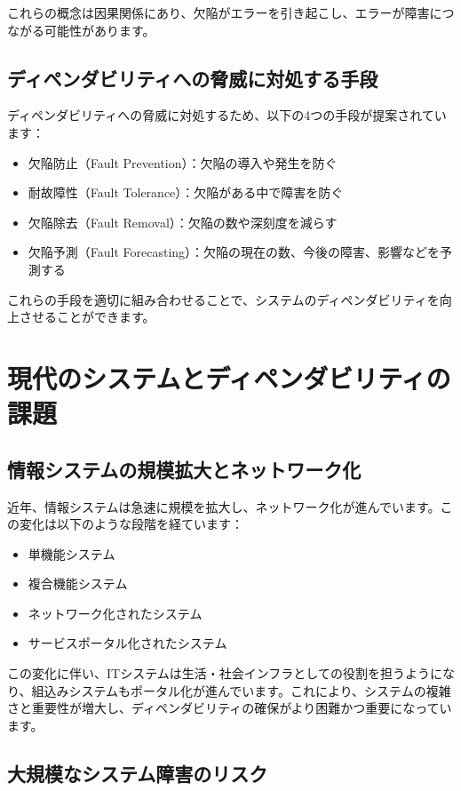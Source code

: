これらの概念は因果関係にあり、欠陥がエラーを引き起こし、エラーが障害につながる可能性があります。

\subsection{ディペンダビリティへの脅威に対処する手段}

ディペンダビリティへの脅威に対処するため、以下の4つの手段が提案されています：
\begin{itemize}
\item 欠陥防止（Fault Prevention）：欠陥の導入や発生を防ぐ
\item 耐故障性（Fault Tolerance）：欠陥がある中で障害を防ぐ
\item 欠陥除去（Fault Removal）：欠陥の数や深刻度を減らす
\item 欠陥予測（Fault Forecasting）：欠陥の現在の数、今後の障害、影響などを予測する
\end{itemize}
これらの手段を適切に組み合わせることで、システムのディペンダビリティを向上させることができます。

\section{現代のシステムとディペンダビリティの課題}

\subsection{情報システムの規模拡大とネットワーク化}

近年、情報システムは急速に規模を拡大し、ネットワーク化が進んでいます。この変化は以下のような段階を経ています：

\begin{itemize}
\item 単機能システム
\item 複合機能システム
\item ネットワーク化されたシステム
\item サービスポータル化されたシステム
\end{itemize}

この変化に伴い、ITシステムは生活・社会インフラとしての役割を担うようになり、組込みシステムもポータル化が進んでいます。これにより、システムの複雑さと重要性が増大し、ディペンダビリティの確保がより困難かつ重要になっています。

\subsection{大規模なシステム障害のリスク}

